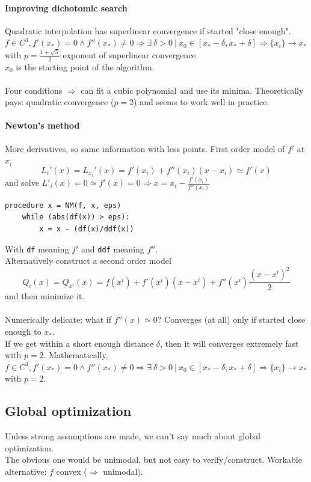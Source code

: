 \documentclass[10pt]{report}
\begin{document}
\paragraph{Improving dichotomic search} Quadratic interpolation has superlinear convergence if started "close enough".\\
$f\in C^3, f'(x_*) = 0 \wedge f''(x_*)\neq 0 \Rightarrow \exists\:\delta > 0\:|\:x_0 \in [x_* - \delta, x_* + \delta] \Rightarrow \{x_i\} \rightarrow x_*$ with $p = \frac{1 + \sqrt{5}}{2}$ exponent of superlinear convergence.\\$x_0$ is the starting point of the algorithm.\\\\
Four conditions $\Rightarrow$ can fit a cubic polynomial and use its minima. Theoretically pays: quadratic convergence ($p = 2$) and seems to work well in practice.
\paragraph{Newton's method} More derivatives, so same information with less points. First order model of $f'$ at $x_i$ $$L_i'(x) = L_{x_i}'(x) = f'(x_i) + f''(x_i)(x-x_i)\simeq f'(x)$$ and solve $L'_i(x) = 0 \simeq f'(x) = 0 \Rightarrow x = x_i-\frac{f'(x_i)}{f''(x_i)}$
\begin{lstlisting}[style=myPython]
procedure x = NM(f, x, eps)
	while (abs(df(x)) > eps):
		x = x - (df(x)/ddf(x))
\end{lstlisting}
With \texttt{df} meaning $f'$ and \texttt{ddf} meaning $f''$.\\
Alternatively construct a second order model $$Q_i(x) = Q_{x^i}(x) = f(x^i) + f'(x^i)(x - x^i) + f''(x^i)\frac{(x - x^i)^2}{2}$$ and then minimize it.\\\\
Numerically delicate: what if $f''(x) \simeq 0$? Converges (at all) only if started close enough to $x_*$.\\
If we get within a short enough distance $\delta$, then it will converges extremely fast with $p = 2$. Mathematically, $f\in C^3, f'(x_*) = 0 \wedge f''(x_*)\neq 0\Rightarrow \exists\:\delta>0\:|\:x_0\in[x_*-\delta, x_*+\delta]\Rightarrow \{x_i\} \rightarrow x_*$ with $p = 2$.
\pagebreak
\subsection{Global optimization} Unless strong assumptions are made, we can't say much about global optimization.\\
The obvious one would be unimodal, but not easy to verify/construct. Workable alternative: $f$ convex ($\Rightarrow$ unimodal).
\end{document}
